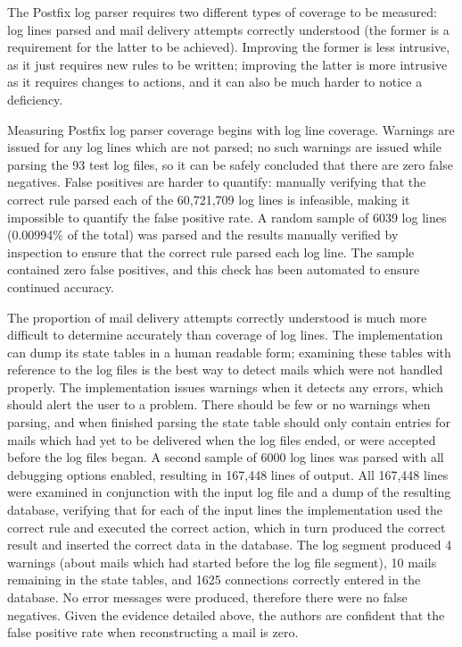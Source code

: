 \documentclass{svmult}
\newcommand{\numberOFlogFILES}[0]{%
    93%
}
\newcommand{\numberOFlogLINES}[0]{%
    60,721,709%
}
\begin{document}
\label{coverage}

The Postfix log parser requires two different types of coverage to be
measured: log lines parsed and mail delivery attempts correctly understood
(the former is a requirement for the latter to be achieved).  Improving the
former is less intrusive, as it just requires new rules to be written;
improving the latter is more intrusive as it requires changes to actions,
and it can also be much harder to notice a deficiency.

Measuring Postfix log parser coverage begins with log line coverage.
Warnings are issued for any log lines which are not parsed; no such
warnings are issued while parsing the \numberOFlogFILES{} test log files,
so it can be safely concluded that there are zero false negatives.  False
positives are harder to quantify: manually verifying that the correct rule
parsed each of the \numberOFlogLINES{} log lines is infeasible, making it
impossible to quantify the false positive rate.  A random sample of 6039
log lines (0.00994\% of the total) was parsed and the results manually
verified by inspection to ensure that the correct rule parsed each log
line.  The sample contained zero false positives, and this check has been
automated to ensure continued accuracy.

The proportion of mail delivery attempts correctly understood is much more
difficult to determine accurately than coverage of log lines.  The
implementation can dump its state tables in a human readable form;
examining these tables with reference to the log files is the best way to
detect mails which were not handled properly.  The implementation issues
warnings when it detects any errors, which should alert the user to a
problem.  There should be few or no warnings when parsing, and when
finished parsing the state table should only contain entries for mails
which had yet to be delivered when the log files ended, or were accepted
before the log files began.  A second sample of 6000 log lines was parsed
with all debugging options enabled, resulting in 167,448 lines of output.
All 167,448 lines were examined in conjunction with the input log file and
a dump of the resulting database, verifying that for each of the input
lines the implementation used the correct rule and executed the correct
action, which in turn produced the correct result and inserted the correct
data in the database.  The log segment produced 4 warnings (about mails
which had started before the log file segment), 10 mails remaining in the
state tables, and 1625 connections correctly entered in the database.  No
error messages were produced, therefore there were no false negatives.
Given the evidence detailed above, the authors are confident that the false
positive rate when reconstructing a mail is zero.
\end{document}
